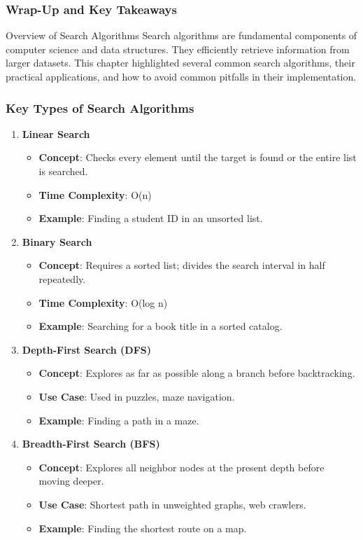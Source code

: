 \documentclass[aspectratio=169]{beamer}
\begin{document}
\begin{frame}[fragile]
    \frametitle{Wrap-Up and Key Takeaways}
    \begin{block}{Overview of Search Algorithms}
        Search algorithms are fundamental components of computer science and data structures. 
        They efficiently retrieve information from larger datasets. 
        This chapter highlighted several common search algorithms, their practical applications, 
        and how to avoid common pitfalls in their implementation.
    \end{block}
\end{frame}

\begin{frame}[fragile]
    \frametitle{Key Types of Search Algorithms}
    \begin{enumerate}
        \item \textbf{Linear Search}
            \begin{itemize}
                \item \textbf{Concept}: Checks every element until the target is found or the entire list is searched.
                \item \textbf{Time Complexity}: O(n)
                \item \textbf{Example}: Finding a student ID in an unsorted list.
            \end{itemize}
        \item \textbf{Binary Search}
            \begin{itemize}
                \item \textbf{Concept}: Requires a sorted list; divides the search interval in half repeatedly.
                \item \textbf{Time Complexity}: O(log n)
                \item \textbf{Example}: Searching for a book title in a sorted catalog.
            \end{itemize}
        \item \textbf{Depth-First Search (DFS)}
            \begin{itemize}
                \item \textbf{Concept}: Explores as far as possible along a branch before backtracking.
                \item \textbf{Use Case}: Used in puzzles, maze navigation.
                \item \textbf{Example}: Finding a path in a maze.
            \end{itemize}
        \item \textbf{Breadth-First Search (BFS)}
            \begin{itemize}
                \item \textbf{Concept}: Explores all neighbor nodes at the present depth before moving deeper.
                \item \textbf{Use Case}: Shortest path in unweighted graphs, web crawlers.
                \item \textbf{Example}: Finding the shortest route on a map.
            \end{itemize}
    \end{enumerate}
\end{frame}
\end{document}
